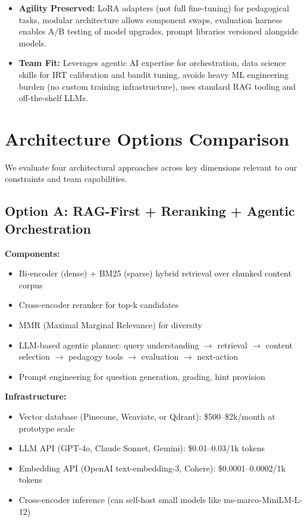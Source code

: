 \documentclass[11pt,letterpaper]{article}
\begin{document}
\begin{itemize}[leftmargin=*]
\item \textbf{Agility Preserved:} LoRA adapters (not full fine-tuning) for pedagogical tasks, modular architecture allows component swaps, evaluation harness enables A/B testing of model upgrades, prompt libraries versioned alongside models.

\item \textbf{Team Fit:} Leverages agentic AI expertise for orchestration, data science skills for IRT calibration and bandit tuning, avoids heavy ML engineering burden (no custom training infrastructure), uses standard RAG tooling and off-the-shelf LLMs.
\end{itemize}

\newpage

\section{Architecture Options Comparison}

We evaluate four architectural approaches across key dimensions relevant to our constraints and team capabilities.

\subsection{Option A: RAG-First + Reranking + Agentic Orchestration}

\textbf{Components:}
\begin{itemize}
\item Bi-encoder (dense) + BM25 (sparse) hybrid retrieval over chunked content corpus
\item Cross-encoder reranker for top-k candidates
\item MMR (Maximal Marginal Relevance) for diversity
\item LLM-based agentic planner: query understanding $\rightarrow$ retrieval $\rightarrow$ content selection $\rightarrow$ pedagogy tools $\rightarrow$ evaluation $\rightarrow$ next-action
\item Prompt engineering for question generation, grading, hint provision
\end{itemize}

\textbf{Infrastructure:}
\begin{itemize}
\item Vector database (Pinecone, Weaviate, or Qdrant): \$500--\$2k/month at prototype scale
\item LLM API (GPT-4o, Claude Sonnet, Gemini): \$0.01--0.03/1k tokens
\item Embedding API (OpenAI text-embedding-3, Cohere): \$0.0001--0.0002/1k tokens
\item Cross-encoder inference (can self-host small models like ms-marco-MiniLM-L-12)
\end{itemize}
\end{document}
